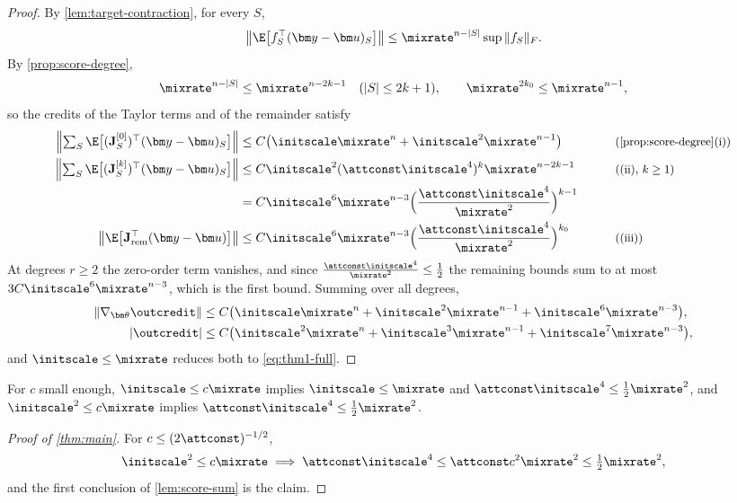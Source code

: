 \begin{proof}
By \cref{lem:target-contraction}, for every $S$,
\[
 \bigl\|\E\bigl[f_S^\top(\bm y-\bm u)_S\bigr]\bigr\|\le\mixrate^{n-|S|}\sup\|f_S\|_F .
\]
By \cref{prop:score-degree},
\[
 \mixrate^{n-|S|}\le\mixrate^{n-2k-1}\quad(|S|\le2k+1),\qquad \mixrate^{2k_0}\le\mixrate^{n-1},
\]
so the credits of the Taylor terms and of the remainder satisfy
\begin{alignat*}{2}
 \Bigl\|\textstyle\sum_S\E\bigl[(\mathbf J^{[0]}_S)^\top(\bm y-\bm u)_S\bigr]\Bigr\|&\le C\bigl(\initscale\mixrate^n+\initscale^2\mixrate^{n-1}\bigr) &\qquad& \why{\cref{prop:score-degree}(i)}\\
 \Bigl\|\textstyle\sum_S\E\bigl[(\mathbf J^{[k]}_S)^\top(\bm y-\bm u)_S\bigr]\Bigr\|&\le C\initscale^2(\attconst\initscale^4)^k\mixrate^{n-2k-1} && \why{(ii), $k\ge1$}\\
 &=C\initscale^6\mixrate^{n-3}\Bigl(\frac{\attconst\initscale^4}{\mixrate^2}\Bigr)^{k-1} && \\
 \bigl\|\E\bigl[\mathbf J_{\mathrm{rem}}^\top(\bm y-\bm u)\bigr]\bigr\|&\le C\initscale^6\mixrate^{n-3}\Bigl(\frac{\attconst\initscale^4}{\mixrate^2}\Bigr)^{k_0} && \why{(iii)}
\end{alignat*}
At degrees $r\ge2$ the zero-order term vanishes, and since $\frac{\attconst\initscale^4}{\mixrate^2}\le\frac{1}{2}$ the remaining bounds sum to at most
$3C\initscale^6\mixrate^{n-3}$, which is the first bound. Summing over all degrees,
\begin{align*}
 \|\nabla_{\bm\theta}\outcredit\|&\le C\bigl(\initscale\mixrate^n+\initscale^2\mixrate^{n-1}+\initscale^6\mixrate^{n-3}\bigr),\\
 |\outcredit|&\le C\bigl(\initscale^2\mixrate^n+\initscale^3\mixrate^{n-1}+\initscale^7\mixrate^{n-3}\bigr),
\end{align*}
and $\initscale\le\mixrate$ reduces both to \cref{eq:thm1-full}.
\end{proof}

For $c$ small enough, $\initscale\le c\mixrate$ implies $\initscale\le\mixrate$ and $\attconst\initscale^4\le\frac{1}{2}\mixrate^2$, and $\initscale^2\le c\mixrate$ implies $\attconst\initscale^4\le\frac{1}{2}\mixrate^2$.

\begin{proof}[Proof of \cref{thm:main}]
For $c\le(2\attconst)^{-1/2}$,
\[
 \initscale^2\le c\mixrate\implies \attconst\initscale^4\le\attconst c^2\mixrate^2\le\tfrac{1}{2}\mixrate^2,
\]
and the first conclusion of \cref{lem:score-sum} is the claim.
\end{proof}

